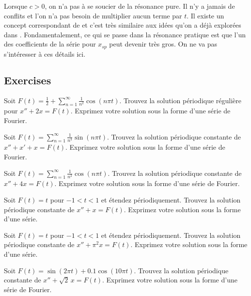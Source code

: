 Lorsque $ c> 0 $, on n'a pas à se soucier de la résonance pure. Il n'y a jamais de conflits et l'on n'a pas besoin de multiplier aucun terme par $ t $. Il existe un concept correspondant de 
et c'est très similaire aux idées qu'on a déjà explorées dans
.
Fondamentalement, ce qui se passe dans la résonance pratique est que l'un des
 coefficients de la série pour $ x_ {sp} $ peut devenir très gros. On ne va pas s'intéresser à ces détails ici.  

\subsection{Exercises}

\begin{exercise}
Soit $F(t) = \frac{1}{2} + \sum_{n=1}^\infty \frac{1}{n^2} \cos (n \pi t)$.
Trouvez la solution périodique régulière pour
$x'' + 2 x = F(t)$.  Exprimez votre solution sous la forme d'une série de Fourier. 
\end{exercise}

\begin{exercise}
Soit $F(t) = \sum_{n=1}^\infty \frac{1}{n^3} \sin (n \pi t)$.  Trouvez
la solution périodique constante de 
$x'' + x' + x = F(t)$. Exprimez votre solution sous la forme d'une série de Fourier. 
\end{exercise}

\begin{exercise}
Soit $F(t) = \sum_{n=1}^\infty \frac{1}{n^2} \cos (n \pi t)$. Trouvez
la solution périodique constante de 
$x'' + 4 x = F(t)$.  Exprimez votre solution sous la forme d'une série de Fourier. 
\end{exercise}

\begin{exercise}
Soit $F(t) = t$ pour $-1 < t < 1$ et étendez périodiquement.
Trouvez la solution périodique constante de 
$x'' + x = F(t)$.  Exprimez votre solution sous la forme d'une série.
\end{exercise}

\begin{exercise}
Soit $F(t) = t$ pour $-1 < t < 1$ et étendez périodiquement.
Trouvez la solution périodique constante de 
$x'' + \pi^2 x = F(t)$. Exprimez votre solution sous la forme d'une série.
\end{exercise}

\setcounter{exercise}{100}

\begin{exercise}
Soit $F(t) = \sin(2\pi t) + 0.1 \cos(10 \pi t)$.
Trouvez la solution périodique constante de $x'' + \sqrt{2}\, x = F(t)$.
Exprimez votre solution sous la forme d'une série de Fourier.
\end{exercise}

